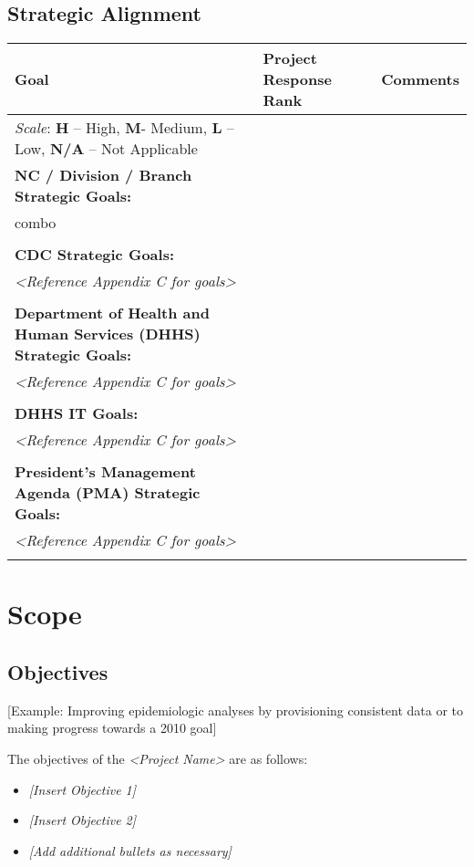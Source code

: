 \hypertarget{strategic-alignment}{%
\subsection{Strategic Alignment}\label{strategic-alignment}}

\begin{longtable}[]{@{}lll@{}}
\toprule
\textbf{Goal} & \textbf{Project Response Rank} &
\textbf{Comments}\tabularnewline
\midrule
\endhead
\emph{Scale}: \textbf{H} -- High, \textbf{M}- Medium, \textbf{L} -- Low,
\textbf{N/A} -- Not Applicable & &\tabularnewline
\textbf{NC / Division / Branch Strategic Goals:} & &\tabularnewline
combo & &\tabularnewline
& &\tabularnewline
\textbf{CDC Strategic Goals:} & &\tabularnewline
\emph{\textless{}Reference Appendix C for goals\textgreater{}} &
&\tabularnewline
& &\tabularnewline
\textbf{Department of Health and Human Services (DHHS) Strategic Goals:
} & &\tabularnewline
\emph{\textless{}Reference Appendix C for goals\textgreater{}} &
&\tabularnewline
& &\tabularnewline
\textbf{DHHS IT Goals:} & &\tabularnewline
\emph{\textless{}Reference Appendix C for goals\textgreater{}} &
&\tabularnewline
& &\tabularnewline
\textbf{President's Management Agenda (PMA) Strategic Goals:} &
&\tabularnewline
\emph{\textless{}Reference Appendix C for goals\textgreater{}} &
&\tabularnewline
& &\tabularnewline
\bottomrule
\end{longtable}

\hypertarget{scope}{%
\section{Scope}\label{scope}}

\hypertarget{objectives}{%
\subsection{Objectives}\label{objectives}}

{[}Example: Improving epidemiologic analyses by provisioning consistent
data or to making progress towards a 2010 goal{]}

The objectives of the \emph{\textless{}Project Name\textgreater{}} are
as follows:

\begin{itemize}
\item
  \emph{{[}Insert Objective 1{]}}
\item
  \emph{{[}Insert Objective 2{]}}
\item
  \emph{{[}Add additional bullets as necessary{]}}
\end{itemize}

